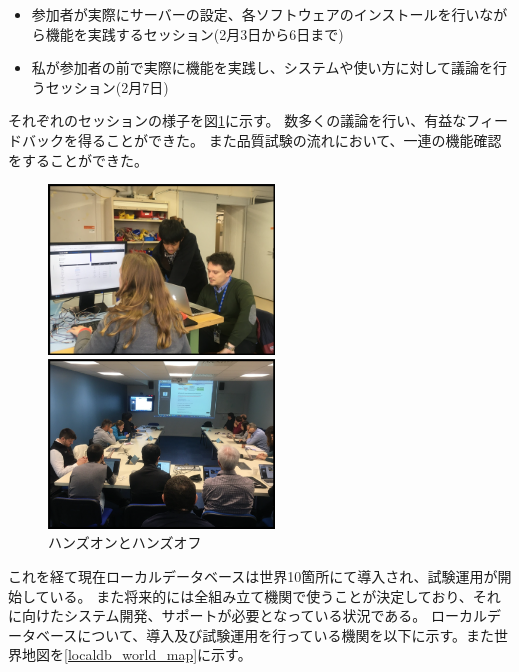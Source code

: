 \begin{itemize}
  \item 参加者が実際にサーバーの設定、各ソフトウェアのインストールを行いながら機能を実践するセッション(2月3日から6日まで)
  \item 私が参加者の前で実際に機能を実践し、システムや使い方に対して議論を行うセッション(2月7日)
\end{itemize}

それぞれのセッションの様子を図\ref{Tutorial_picture}に示す。
数多くの議論を行い、有益なフィードバックを得ることができた。
また品質試験の流れにおいて、一連の機能確認をすることができた。

\begin{figure}[bpt]
  \begin{center}
  \begin{minipage}{0.4\hsize}
    \includegraphics[width=6cm]{hands_on}
  \end{minipage}
  \begin{minipage}{0.4\hsize}
    \includegraphics[width=6cm]{hands_off}
  \end{minipage}
  \caption[ハンズオンとハンズオフ]{ハンズオンとハンズオフ}
  \label{Tutorial_picture}
  \end{center}
\end{figure}

これを経て現在ローカルデータベースは世界10箇所にて導入され、試験運用が開始している。
また将来的には全組み立て機関で使うことが決定しており、それに向けたシステム開発、サポートが必要となっている状況である。
ローカルデータベースについて、導入及び試験運用を行っている機関を以下に示す。また世界地図を\ref{localdb_world_map}に示す。

